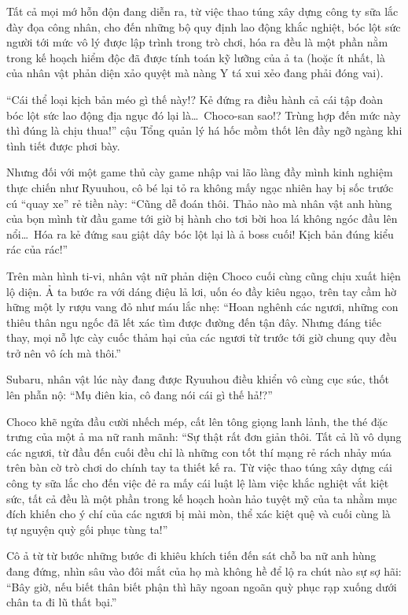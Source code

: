 \documentclass[../main.tex]{subfiles}
\begin{document}
Tất cả mọi mớ hỗn độn đang diễn ra, từ việc thao túng xây dựng công ty sữa lắc đày đọa công nhân, cho đến những bộ quy định lao động khắc nghiệt, bóc lột sức người tới mức vô lý được lập trình trong trò chơi, hóa ra đều là một phần nằm trong kế hoạch hiểm độc đã được tính toán kỹ lưỡng của ả ta (hoặc ít nhất, là của nhân vật phản diện xảo quyệt mà nàng Y tá xui xẻo đang phải đóng vai).

``Cái thể loại kịch bản méo gì thế này!? Kẻ đứng ra điều hành cả cái tập đoàn bóc lột sức lao động địa ngục đó lại là\dots\ Choco-san sao!? Trùng hợp đến mức này thì đúng là chịu thua!'' cậu Tổng quản lý há hốc mồm thốt lên đầy ngỡ ngàng khi tình tiết được phơi bày.

Nhưng đối với một game thủ cày game nhập vai lão làng đầy mình kinh nghiệm thực chiến như Ryuuhou, cô bé lại tỏ ra không mấy ngạc nhiên hay bị sốc trước cú ``quay xe'' rẻ tiền này: ``Cũng dễ đoán thôi. Thảo nào mà nhân vật anh hùng của bọn mình từ đầu game tới giờ bị hành cho tơi bời hoa lá không ngóc đầu lên nổi\dots\ Hóa ra kẻ đứng sau giật dây bóc lột lại là ả boss cuối! Kịch bản đúng kiểu rác của rác!''

Trên màn hình ti-vi, nhân vật nữ phản diện Choco cuối cùng cũng chịu xuất hiện lộ diện. Ả ta bước ra với dáng điệu lả lơi, uốn éo đầy kiêu ngạo, trên tay cầm hờ hững một ly rượu vang đỏ như máu lắc nhẹ: ``Hoan nghênh các ngươi, những con thiêu thân ngu ngốc đã lết xác tìm được đường đến tận đây. Nhưng đáng tiếc thay, mọi nỗ lực cày cuốc thảm hại của các ngươi từ trước tới giờ chung quy đều trở nên vô ích mà thôi.''

Subaru, nhân vật lúc này đang được Ryuuhou điều khiển vô cùng cục súc, thốt lên phẫn nộ: ``Mụ điên kia, cô đang nói cái gì thế hả!?''

Choco khẽ ngửa đầu cười nhếch mép, cất lên tông giọng lanh lảnh, the thé đặc trưng của một ả ma nữ ranh mãnh: ``Sự thật rất đơn giản thôi. Tất cả lũ vô dụng các ngươi, từ đầu đến cuối đều chỉ là những con tốt thí mạng rẻ rách nhảy múa trên bàn cờ trò chơi do chính tay ta thiết kế ra. Từ việc thao túng xây dựng cái công ty sữa lắc cho đến việc đẻ ra mấy cái luật lệ làm việc khắc nghiệt vắt kiệt sức, tất cả đều là một phần trong kế hoạch hoàn hảo tuyệt mỹ của ta nhằm mục đích khiến cho ý chí của các ngươi bị mài mòn, thể xác kiệt quệ và cuối cùng là tự nguyện quỳ gối phục tùng ta!''

Cô ả từ từ bước những bước đi khiêu khích tiến đến sát chỗ ba nữ anh hùng đang đứng, nhìn sâu vào đôi mắt của họ mà không hề để lộ ra chút nào sự sợ hãi: ``Bây giờ, nếu biết thân biết phận thì hãy ngoan ngoãn quỳ phục rạp xuống dưới chân ta đi lũ thất bại.''
\end{document}
